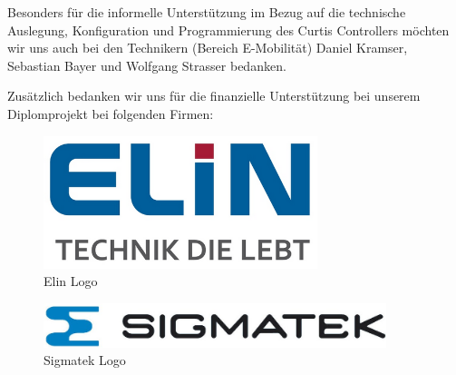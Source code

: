Besonders für die informelle Unterstützung im Bezug auf die technische Auslegung, Konfiguration und Programmierung des Curtis Controllers möchten wir uns auch bei den Technikern (Bereich E-Mobilität) Daniel Kramser, Sebastian Bayer und Wolfgang Strasser bedanken.

\vspace{0,5cm}

Zusätzlich bedanken wir uns für die finanzielle Unterstützung bei unserem Diplomprojekt bei folgenden Firmen:

\begin{figure}[H]
	\begin{center}
		\includegraphics[width=8cm]{figures/allgemein/Elin Logo.png}
		\caption{Elin Logo}
	\end{center}
\end{figure}


\vspace{1cm}

\begin{figure} [H]
	\begin{center}
		\includegraphics[width=10cm]{figures/allgemein/Sigmatek_LOGO.jpg}
		\caption{Sigmatek Logo}
	\end{center}
\end{figure}


\newpage
\thispagestyle{empty}
\mbox{}
\newpage



